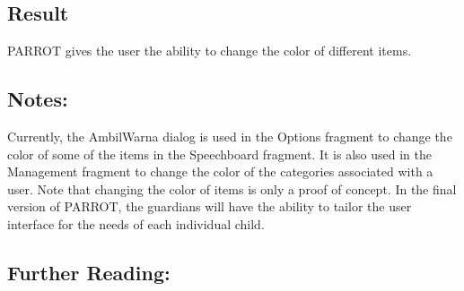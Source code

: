 \subsection*{Result}
PARROT gives the user the ability to change the color of different items.\newline

\subsection*{Notes:}
Currently, the AmbilWarna dialog is used in the Options fragment %
to change the color of some of the items in the Speechboard fragment. It is also used in the Management fragment to change the color of the categories associated with a user.\newline
Note that changing the color of items is only a proof of concept. In the final version of PARROT, the guardians will have the ability to tailor the user interface for the needs of each individual child.\newline

\subsection*{Further Reading:}
